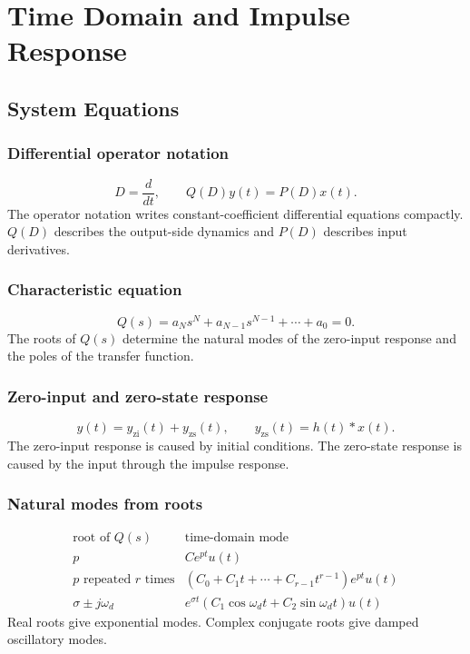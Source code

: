 \section{Time Domain and Impulse Response}

\subsection{System Equations}

\subsubsection{Differential operator notation}
\[
D=\frac{d}{dt}, \qquad Q(D)y(t)=P(D)x(t).
\]
The operator notation writes constant-coefficient differential equations compactly. \(Q(D)\) describes the output-side dynamics and \(P(D)\) describes input derivatives.

\subsubsection{Characteristic equation}
\[
Q(s)=a_Ns^N+a_{N-1}s^{N-1}+\cdots+a_0=0.
\]
The roots of \(Q(s)\) determine the natural modes of the zero-input response and the poles of the transfer function.

\subsubsection{Zero-input and zero-state response}
\[
y(t)=y_{\mathrm{zi}}(t)+y_{\mathrm{zs}}(t), \qquad
y_{\mathrm{zs}}(t)=h(t)*x(t).
\]
The zero-input response is caused by initial conditions. The zero-state response is caused by the input through the impulse response.

\subsubsection{Natural modes from roots}
\[
\begin{array}{c|c}
\text{root of }Q(s) & \text{time-domain mode}\\ \hline
p & C e^{pt}u(t)\\
p\text{ repeated }r\text{ times} & (C_0+C_1t+\cdots+C_{r-1}t^{r-1})e^{pt}u(t)\\
\sigma\pm j\omega_d & e^{\sigma t}(C_1\cos\omega_d t+C_2\sin\omega_d t)u(t)
\end{array}
\]
Real roots give exponential modes. Complex conjugate roots give damped oscillatory modes.

